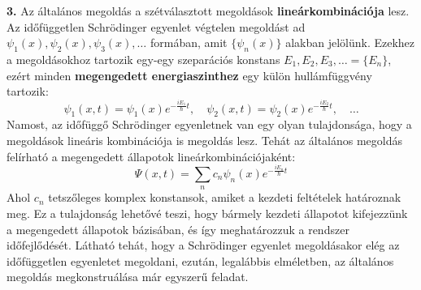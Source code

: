\documentclass[../main.tex]{subfiles}
\begin{document}
\textbf{3.} Az általános megoldás a szétválasztott megoldások \textbf{lineárkombinációja} lesz. Az időfüggetlen Schrödinger egyenlet végtelen megoldást ad $\psi_1 (x), \psi_2 (x), \psi_3 (x), \ldots$ formában, amit $\{\psi_n(x)\}$ alakban jelölünk.
Ezekhez a megoldásokhoz tartozik egy-egy szeparációs konstans $E_1, E_2, E_3, \ldots = \{E_n\}$, ezért minden \textbf{megengedett energiaszinthez} egy külön hullámfüggvény tartozik:
\begin{equation}
    \psi_1(x, t) = \psi_1(x) e^{-\frac{i E_1}{\hbar} t}, \quad \psi_2(x, t) = \psi_2(x) e^{-\frac{i E_2}{\hbar} t}, \quad \ldots
\end{equation}
Namost, az időfüggő Schrödinger egyenletnek van egy olyan tulajdonsága, hogy a megoldások lineáris kombinációja is megoldás lesz. Tehát az általános megoldás felírható a megengedett állapotok lineárkombinációjaként:
\begin{equation}
    \Psi(x,t) = \sum_n c_n \psi_n(x) e^{-\frac{i E_n}{\hbar} t}
\end{equation}
Ahol $c_n$ tetszőleges komplex konstansok, amiket a kezdeti feltételek határoznak meg. Ez a tulajdonság lehetővé teszi, hogy bármely kezdeti állapotot kifejezzünk a megengedett állapotok bázisában, és így meghatározzuk a rendszer időfejlődését.
Látható tehát, hogy a Schrödinger egyenlet megoldásakor elég az időfüggetlen egyenletet megoldani, ezután, legalábbis elméletben, az általános megoldás megkonstruálása már egyszerű feladat.
\end{document}
